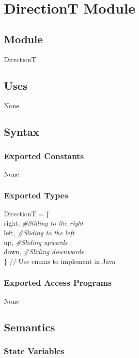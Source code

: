 \documentclass[12pt]{article}
\begin{document}
\section* {DirectionT Module}

\subsection*{Module}
DirectionT

\subsection* {Uses}

None

\subsection* {Syntax}

\subsubsection* {Exported Constants}

None

\subsubsection* {Exported Types}

DirectionT = \{\\
    right, \textit{\#Sliding to the right}\\
    left, \textit{\#Sliding to the left}\\
    up, \textit{\#Sliding upwards}\\
    down, \textit{\#Sliding downwards}\\
\} $//$ Use enums to implement in Java

\subsubsection* {Exported Access Programs}

None

\subsection* {Semantics}

\subsubsection* {State Variables}
\end{document}
